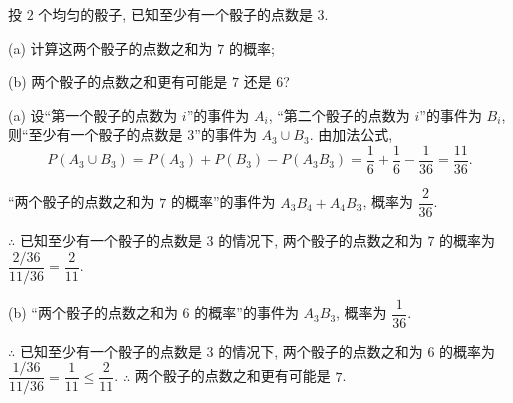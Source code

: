 \documentclass{ctexart}
\begin{document}
\begin{exercise}%
    投 $2$ 个均匀的骰子, 已知至少有一个骰子的点数是 $3$.

    (a) 计算这两个骰子的点数之和为 $7$ 的概率;
    
    (b) 两个骰子的点数之和更有可能是 $7$ 还是 $6$?
\end{exercise}
\begin{solution}
    (a) 设``第一个骰子的点数为 $i$''的事件为 $A_i$, ``第二个骰子的点数为 $i$''的事件为 $B_i$, 则``至少有一个骰子的点数是 $3$''的事件为 $A_3\cup B_3$. 由加法公式,
    \[P(A_3\cup B_3)=P(A_3)+P(B_3)-P(A_3B_3)=\dfrac{1}{6}+\dfrac{1}{6}-\dfrac{1}{36}=\dfrac{11}{36}.\]

    ``两个骰子的点数之和为 $7$ 的概率''的事件为 $A_3B_4+A_4B_3$, 概率为 $\dfrac{2}{36}$.

    $\therefore$ 已知至少有一个骰子的点数是 $3$ 的情况下, 两个骰子的点数之和为 $7$ 的概率为 $\dfrac{2/36}{11/36}=\dfrac{2}{11}$.

    (b) ``两个骰子的点数之和为 $6$ 的概率''的事件为 $A_3B_3$, 概率为 $\dfrac{1}{36}$.

    $\therefore$ 已知至少有一个骰子的点数是 $3$ 的情况下, 两个骰子的点数之和为 $6$ 的概率为 $\dfrac{1/36}{11/36}=\dfrac{1}{11}\leq\dfrac{2}{11}$. $\therefore$ 两个骰子的点数之和更有可能是 $7$.
\end{solution}
\end{document}
